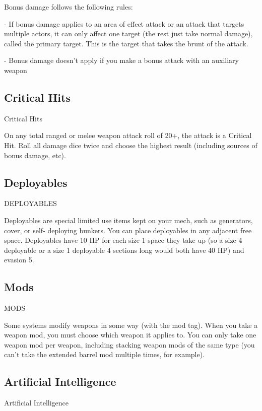                                                                                                                 


Bonus damage follows the following rules:
 
         	- If bonus damage applies to an area of effect attack or an attack that targets multiple  
         actors, it can only affect one target (the rest just take normal damage), called the primary  
         target. This is the target that takes the brunt of the attack.
 
         	- Bonus damage doesn’t apply if you make a bonus attack with an auxiliary weapon  
\subsection{Critical Hits}
                                                Critical Hits  

On any total ranged or melee weapon attack roll of 20+, the attack is a Critical Hit. Roll all  
damage dice twice and choose the highest result (including sources of bonus damage, etc).  
\subsection{Deployables}
                                             DEPLOYABLES  

Deployables are special limited use items kept on your mech, such as generators, cover, or self- 
deploying bunkers. You can place deployables in any adjacent free space. Deployables have 10  
HP for each size 1 space they take up (so a size 4 deployable or a size 1 deployable 4 sections  
long would both have 40 HP) and evasion 5.  
\subsection{Mods}
                                                    MODS  

Some systems modify weapons in some way (with the mod tag). When you take a weapon mod,  
you must choose which weapon it applies to. You can only take one weapon mod per weapon,  
including stacking weapon mods of the same type (you can’t take the extended barrel mod  
multiple times, for example).  
\subsection{Artificial Intelligence}
                                        Artificial Intelligence  

